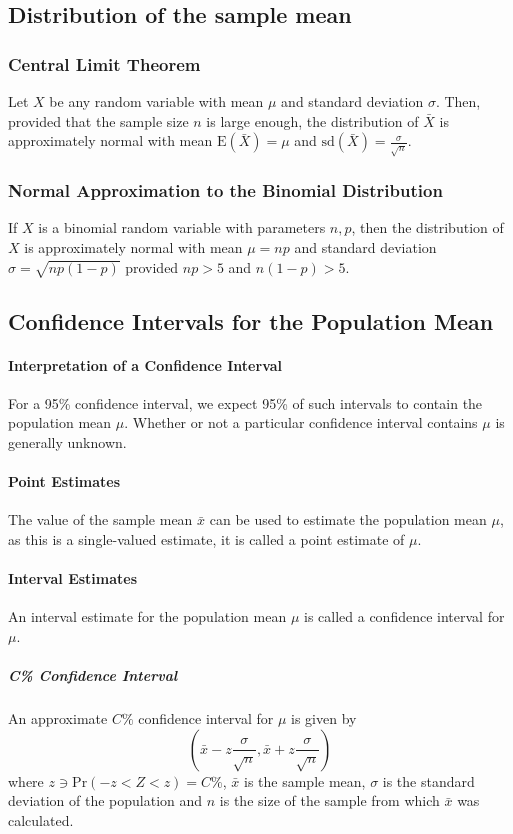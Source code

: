 \documentclass[a4paper,twoside,10pt]{article}
\begin{document}
		\subsection{Distribution of the sample mean}
			\subsubsection{Central Limit Theorem} Let $X$ be any random variable with mean $\mu$ and standard deviation $\sigma$. Then, provided that the sample size $n$ is large enough, the distribution of $\bar{X}$ is approximately normal with mean $\mathrm{E}(\bar{X})=\mu$ and $\mathrm{sd}(\bar{X})=\frac{\sigma}{\sqrt{n}}$.
			
			\subsubsection{Normal Approximation to the Binomial Distribution} If $X$ is a binomial random variable with parameters $n,p$, then the distribution of $X$ is approximately normal with mean $\mu=np$ and standard deviation $\sigma=\sqrt{np(1-p)}$ provided $np>5$ and $n(1-p)>5$.
			
		\subsection{Confidence Intervals for the Population Mean}
			\paragraph{Interpretation of a Confidence Interval} For a 95\% confidence interval, we expect 95\% of such intervals to contain the population mean $\mu$. Whether or not a particular confidence interval contains $\mu$ is generally unknown.
			
			\paragraph{Point Estimates} The value of the sample mean $\bar{x}$ can be used to estimate the population mean $\mu$, as this is a single-valued estimate, it is called a point estimate of $\mu$.
			
			\paragraph{Interval Estimates} An interval estimate for the population mean $\mu$ is called a confidence interval for $\mu$.
				\subparagraph{C\% Confidence Interval} An approximate $C\%$ confidence interval for $\mu$ is given by
				\[
					\left(\bar{x}-z\frac{\sigma}{\sqrt{n}},\bar{x}+z\frac{\sigma}{\sqrt{n}}\right)
				\]
				where $z\ni\mathrm{Pr}(-z<Z<z)=C\%$, $\bar{x}$ is the sample mean, $\sigma$ is the standard deviation of the population and $n$ is the size of the sample from which $\bar{x}$ was calculated.\\\\
				
\end{document}
